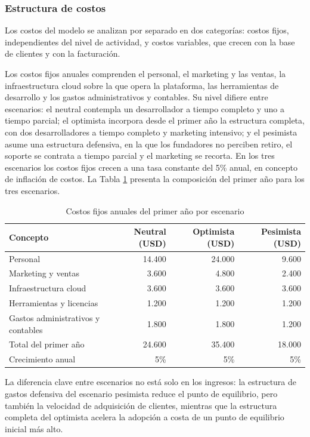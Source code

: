 \subsubsection{Estructura de costos}

Los costos del modelo se analizan por separado en dos categorías: costos fijos, independientes del nivel de actividad, y costos variables, que crecen con la base de clientes y con la facturación.

Los costos fijos anuales comprenden el personal, el marketing y las ventas, la infraestructura cloud sobre la que opera la plataforma, las herramientas de desarrollo y los gastos administrativos y contables. Su nivel difiere entre escenarios: el neutral contempla un desarrollador a tiempo completo y uno a tiempo parcial; el optimista incorpora desde el primer año la estructura completa, con dos desarrolladores a tiempo completo y marketing intensivo; y el pesimista asume una estructura defensiva, en la que los fundadores no perciben retiro, el soporte se contrata a tiempo parcial y el marketing se recorta. En los tres escenarios los costos fijos crecen a una tasa constante del 5\% anual, en concepto de inflación de costos. La Tabla \ref{tab:costos-fijos} presenta la composición del primer año para los tres escenarios.

\begin{table}[H]
\centering
\begin{tabular}{l r r r}
\hline
Concepto & Neutral (USD) & Optimista (USD) & Pesimista (USD) \\
\hline
Personal & 14.400 & 24.000 & 9.600 \\
Marketing y ventas & 3.600 & 4.800 & 2.400 \\
Infraestructura cloud & 3.600 & 3.600 & 3.600 \\
Herramientas y licencias & 1.200 & 1.200 & 1.200 \\
Gastos administrativos y contables & 1.800 & 1.800 & 1.200 \\
\hline
Total del primer año & 24.600 & 35.400 & 18.000 \\
Crecimiento anual & 5\% & 5\% & 5\% \\
\hline
\end{tabular}
\caption{Costos fijos anuales del primer año por escenario}
\label{tab:costos-fijos}
\end{table}

La diferencia clave entre escenarios no está solo en los ingresos: la estructura de gastos defensiva del escenario pesimista reduce el punto de equilibrio, pero también la velocidad de adquisición de clientes, mientras que la estructura completa del optimista acelera la adopción a costa de un punto de equilibrio inicial más alto.

